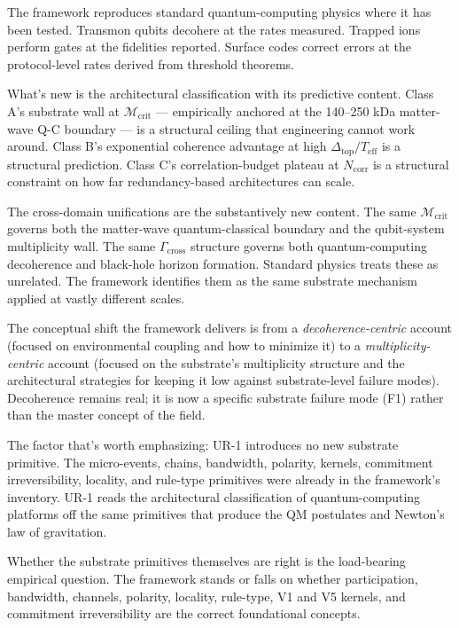 \documentclass[11pt,a4paper]{article}
\begin{document}
The framework reproduces standard quantum-computing physics where it has been tested. Transmon qubits decohere at the rates measured. Trapped ions perform gates at the fidelities reported. Surface codes correct errors at the protocol-level rates derived from threshold theorems.

What's new is the architectural classification with its predictive content. Class A's substrate wall at $\mathcal{M}_{\mathrm{crit}}$ --- empirically anchored at the 140--250 kDa matter-wave Q-C boundary --- is a structural ceiling that engineering cannot work around. Class B's exponential coherence advantage at high $\Delta_{\mathrm{top}}/T_{\mathrm{eff}}$ is a structural prediction. Class C's correlation-budget plateau at $N_{\mathrm{corr}}$ is a structural constraint on how far redundancy-based architectures can scale.

The cross-domain unifications are the substantively new content. The same $\mathcal{M}_{\mathrm{crit}}$ governs both the matter-wave quantum-classical boundary and the qubit-system multiplicity wall. The same $\Gamma_{\mathrm{cross}}$ structure governs both quantum-computing decoherence and black-hole horizon formation. Standard physics treats these as unrelated. The framework identifies them as the same substrate mechanism applied at vastly different scales.

The conceptual shift the framework delivers is from a \emph{decoherence-centric} account (focused on environmental coupling and how to minimize it) to a \emph{multiplicity-centric} account (focused on the substrate's multiplicity structure and the architectural strategies for keeping it low against substrate-level failure modes). Decoherence remains real; it is now a specific substrate failure mode (F1) rather than the master concept of the field.

The factor that's worth emphasizing: UR-1 introduces no new substrate primitive. The micro-events, chains, bandwidth, polarity, kernels, commitment irreversibility, locality, and rule-type primitives were already in the framework's inventory. UR-1 reads the architectural classification of quantum-computing platforms off the same primitives that produce the QM postulates and Newton's law of gravitation.

Whether the substrate primitives themselves are right is the load-bearing empirical question. The framework stands or falls on whether participation, bandwidth, channels, polarity, locality, rule-type, V1 and V5 kernels, and commitment irreversibility are the correct foundational concepts.
\end{document}
